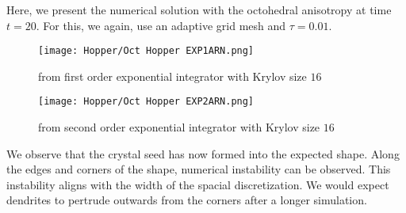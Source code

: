Here, we present the numerical solution with the octohedral anisotropy at time $t=20$.
For this, we again, use an adaptive grid mesh and $\tau = 0.01$.
\begin{figure}[H]
    \centering
    \begin{minipage}{0.49\textwidth}
        \texttt{[image: Hopper/Oct Hopper EXP1ARN.png]} %
        \caption{from first order exponential integrator with Krylov size $16$}
        \label{fig:first order 8 0.5}
    \end{minipage}\hfill
    \centering
    \begin{minipage}{0.49\textwidth}
        \texttt{[image: Hopper/Oct Hopper EXP2ARN.png]} %
        \caption{from second order exponential integrator with Krylov size $16$}
        \label{fig:first order 10 0.5}
    \end{minipage}\hfill
\end{figure}
We observe that the crystal seed has now formed into the expected shape.
Along the edges and corners of the shape, numerical instability can be observed.
This instability aligns with the width of the spacial discretization.
We would expect dendrites to pertrude outwards from the corners after a longer simulation.

